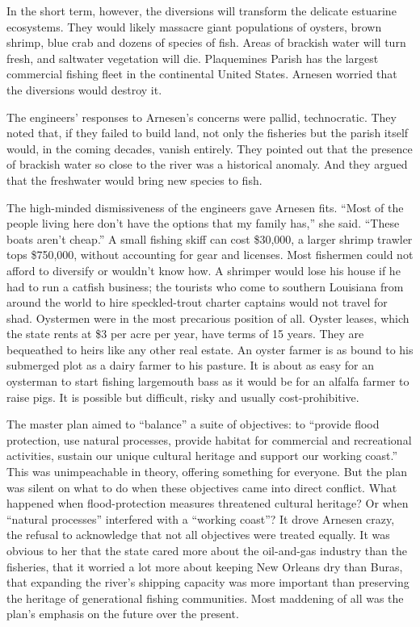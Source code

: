 In the short term, however, the diversions will transform the delicate
estuarine ecosystems. They would likely massacre giant populations of
oysters, brown shrimp, blue crab and dozens of species of fish. Areas of
brackish water will turn fresh, and saltwater vegetation will die.
Plaquemines Parish has the largest commercial fishing fleet in the
continental United States. Arnesen worried that the diversions would
destroy it.

The engineers' responses to Arnesen's concerns were pallid,
technocratic. They noted that, if they failed to build land, not only
the fisheries but the parish itself would, in the coming decades, vanish
entirely. They pointed out that the presence of brackish water so close
to the river was a historical anomaly. And they argued that the
freshwater would bring new species to fish.

The high-minded dismissiveness of the engineers gave Arnesen fits.
``Most of the people living here don't have the options that my family
has,'' she said. ``These boats aren't cheap.'' A small fishing skiff can
cost \$30,000, a larger shrimp trawler tops \$750,000, without
accounting for gear and licenses. Most fishermen could not afford to
diversify or wouldn't know how. A shrimper would lose his house if he
had to run a catfish business; the tourists who come to southern
Louisiana from around the world to hire speckled-trout charter captains
would not travel for shad. Oystermen were in the most precarious
position of all. Oyster leases, which the state rents at \$3 per acre
per year, have terms of 15 years. They are bequeathed to heirs like any
other real estate. An oyster farmer is as bound to his submerged plot as
a dairy farmer to his pasture. It is about as easy for an oysterman to
start fishing largemouth bass as it would be for an alfalfa farmer to
raise pigs. It is possible but difficult, risky and usually
cost-prohibitive.

The master plan aimed to ``balance'' a suite of objectives: to ``provide
flood protection, use natural processes, provide habitat for commercial
and recreational activities, sustain our unique cultural heritage and
support our working coast.'' This was unimpeachable in theory, offering
something for everyone. But the plan was silent on what to do when these
objectives came into direct conflict. What happened when
flood-protection measures threatened cultural heritage? Or when
``natural processes'' interfered with a ``working coast''? It drove
Arnesen crazy, the refusal to acknowledge that not all objectives were
treated equally. It was obvious to her that the state cared more about
the oil-and-gas industry than the fisheries, that it worried a lot more
about keeping New Orleans dry than Buras, that expanding the river's
shipping capacity was more important than preserving the heritage of
generational fishing communities. Most maddening of all was the plan's
emphasis on the future over the present.

